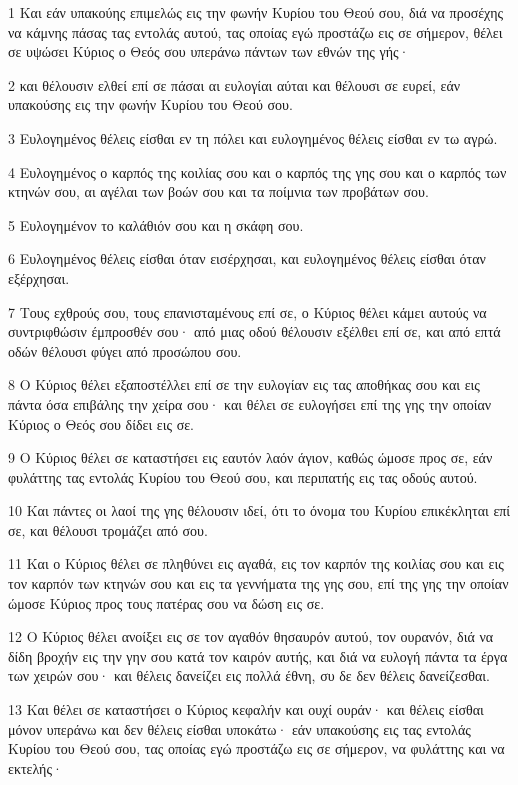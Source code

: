 \par 1 Και εάν υπακούης επιμελώς εις την φωνήν Κυρίου του Θεού σου, διά να προσέχης να κάμνης πάσας τας εντολάς αυτού, τας οποίας εγώ προστάζω εις σε σήμερον, θέλει σε υψώσει Κύριος ο Θεός σου υπεράνω πάντων των εθνών της γής·
\par 2 και θέλουσιν ελθεί επί σε πάσαι αι ευλογίαι αύται και θέλουσι σε ευρεί, εάν υπακούσης εις την φωνήν Κυρίου του Θεού σου.
\par 3 Ευλογημένος θέλεις είσθαι εν τη πόλει και ευλογημένος θέλεις είσθαι εν τω αγρώ.
\par 4 Ευλογημένος ο καρπός της κοιλίας σου και ο καρπός της γης σου και ο καρπός των κτηνών σου, αι αγέλαι των βοών σου και τα ποίμνια των προβάτων σου.
\par 5 Ευλογημένον το καλάθιόν σου και η σκάφη σου.
\par 6 Ευλογημένος θέλεις είσθαι όταν εισέρχησαι, και ευλογημένος θέλεις είσθαι όταν εξέρχησαι.
\par 7 Τους εχθρούς σου, τους επανισταμένους επί σε, ο Κύριος θέλει κάμει αυτούς να συντριφθώσιν έμπροσθέν σου· από μιας οδού θέλουσιν εξέλθει επί σε, και από επτά οδών θέλουσι φύγει από προσώπου σου.
\par 8 Ο Κύριος θέλει εξαποστέλλει επί σε την ευλογίαν εις τας αποθήκας σου και εις πάντα όσα επιβάλης την χείρα σου· και θέλει σε ευλογήσει επί της γης την οποίαν Κύριος ο Θεός σου δίδει εις σε.
\par 9 Ο Κύριος θέλει σε καταστήσει εις εαυτόν λαόν άγιον, καθώς ώμοσε προς σε, εάν φυλάττης τας εντολάς Κυρίου του Θεού σου, και περιπατής εις τας οδούς αυτού.
\par 10 Και πάντες οι λαοί της γης θέλουσιν ιδεί, ότι το όνομα του Κυρίου επικέκληται επί σε, και θέλουσι τρομάζει από σου.
\par 11 Και ο Κύριος θέλει σε πληθύνει εις αγαθά, εις τον καρπόν της κοιλίας σου και εις τον καρπόν των κτηνών σου και εις τα γεννήματα της γης σου, επί της γης την οποίαν ώμοσε Κύριος προς τους πατέρας σου να δώση εις σε.
\par 12 Ο Κύριος θέλει ανοίξει εις σε τον αγαθόν θησαυρόν αυτού, τον ουρανόν, διά να δίδη βροχήν εις την γην σου κατά τον καιρόν αυτής, και διά να ευλογή πάντα τα έργα των χειρών σου· και θέλεις δανείζει εις πολλά έθνη, συ δε δεν θέλεις δανείζεσθαι.
\par 13 Και θέλει σε καταστήσει ο Κύριος κεφαλήν και ουχί ουράν· και θέλεις είσθαι μόνον υπεράνω και δεν θέλεις είσθαι υποκάτω· εάν υπακούσης εις τας εντολάς Κυρίου του Θεού σου, τας οποίας εγώ προστάζω εις σε σήμερον, να φυλάττης και να εκτελής·
